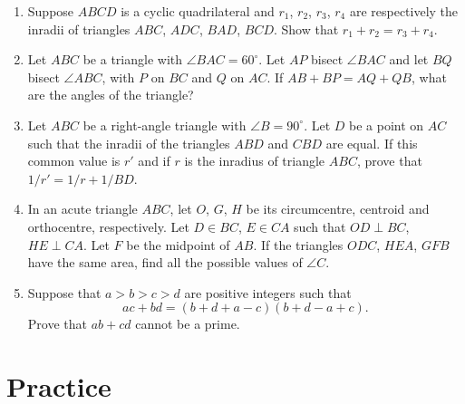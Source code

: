 \documentclass[12pt]{scrartcl}
\begin{document}
\begin{enumerate}[label=E\arabic*.,leftmargin=*,itemsep=0.6em]
\item Suppose $ABCD$ is a cyclic quadrilateral and $r_1$, $r_2$, $r_3$, $r_4$ are respectively the inradii of triangles $ABC$, $ADC$, $BAD$, $BCD$. Show that $r_1 + r_2 = r_3 + r_4$.

\item Let $ABC$ be a triangle with $\angle BAC = 60^\circ$. Let $AP$ bisect $\angle BAC$ and let $BQ$ bisect $\angle ABC$, with $P$ on $BC$ and $Q$ on $AC$. If $AB + BP = AQ + QB$, what are the angles of the triangle?

\item Let $ABC$ be a right-angle triangle with $\angle B = 90^\circ$. Let $D$ be a point on $AC$ such that the inradii of the triangles $ABD$ and $CBD$ are equal. If this common value is $r'$ and if $r$ is the inradius of triangle $ABC$, prove that $1/r' = 1/r + 1/BD$.

\item In an acute triangle $ABC$, let $O$, $G$, $H$ be its circumcentre, centroid and orthocentre, respectively. Let $D \in BC$, $E \in CA$ such that $OD \perp BC$, $HE \perp CA$. Let $F$ be the midpoint of $AB$. If the triangles $ODC$, $HEA$, $GFB$ have the same area, find all the possible values of $\angle C$.

\item Suppose that $a > b > c > d$ are positive integers such that
\[
ac + bd = (b + d + a - c)(b + d - a + c).
\]
Prove that $ab + cd$ cannot be a prime.

\end{enumerate}

\section{Practice}
\end{document}
